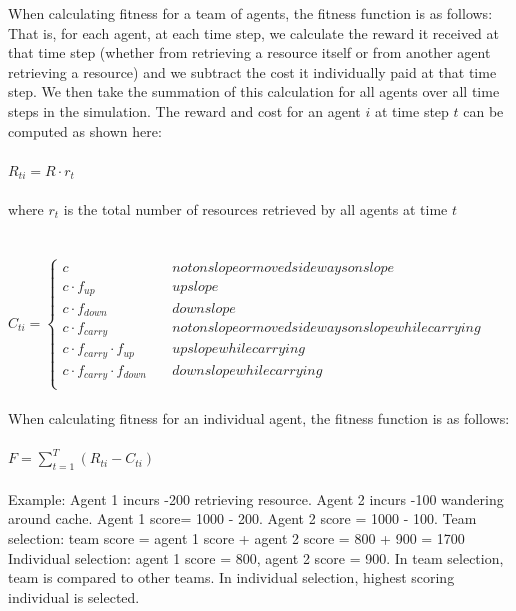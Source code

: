 \documentclass[12pt]{article}  %
\begin{document}
When calculating fitness for a team of agents, the fitness function is as follows:\\ 






That is, for each agent, at each time step, we calculate the reward it received at that time step (whether from retrieving a resource itself or from another agent retrieving a resource) and we subtract the cost it individually paid at that time step. 
We then take the summation of this calculation for all agents over all time steps in the simulation.
The reward and cost for an agent $i$ at time step $t$ can be computed as shown here:\\
\\
$
R_{ti} = R \cdot r_{t}
$\\
\\
where $r_t$ is the total number of resources retrieved by all agents at time $t$
\\
\\
\\
$
C_{ti} = \left\{
        \begin{array}{ll}
            c & \quad not on slope or moved sideways on slope\\
            c \cdot f_{up} & \quad up slope\\
            c \cdot f_{down} & \quad down slope\\
            c \cdot f_{carry} & \quad not on slope or moved sideways on slope while carrying\\
            c \cdot f_{carry} \cdot f_{up} & \quad up slope while carrying \\
            c \cdot f_{carry} \cdot f_{down} & \quad down slope while carrying\\
        \end{array}
    \right.
$
\\
\\
When calculating fitness for an individual agent, the fitness function is as follows:\\
\\
$F = \sum_{t=1}^{T} (R_{ti} - C_{ti}) $
\\
\\
Example: Agent 1 incurs -200 retrieving resource. 
Agent 2 incurs -100 wandering around cache. 
Agent 1 score= 1000 - 200. 
Agent 2 score = 1000 - 100.
Team selection: team score = agent 1 score + agent 2 score = 800 + 900 = 1700
Individual selection: agent 1 score = 800, agent 2 score = 900. 
In team selection, team is compared to other teams. 
In individual selection, highest scoring individual is selected. 
\end{document}

